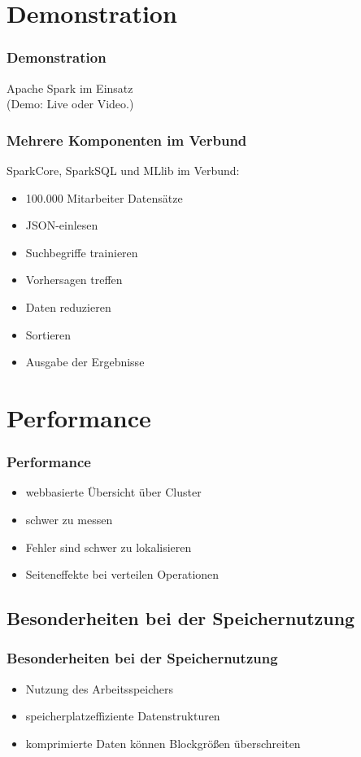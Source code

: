 \documentclass[hyperref={pdfpagelabels=false}]{beamer}
\begin{document}
\section{Demonstration}
\begin{frame} [t]
\frametitle{Demonstration}

Apache Spark im Einsatz \\
\textcolor[rgb]{0.75,0.75,0.75}{(Demo: Live oder Video.)}

\end{frame}


\begin{frame} [t]
\frametitle{Mehrere Komponenten im Verbund}

SparkCore, SparkSQL und MLlib im Verbund: 
\begin{itemize}	
	\item 100.000 Mitarbeiter Datensätze
	\item JSON-einlesen	
	\item Suchbegriffe trainieren
	\item Vorhersagen treffen
	\item Daten reduzieren	
	\item Sortieren
	\item Ausgabe der Ergebnisse	
\end{itemize}

\end{frame}


\section{Performance}
\begin{frame} [t]
\frametitle{Performance}

\begin{itemize}
	\item webbasierte Übersicht über Cluster
	\item schwer zu messen
	\item Fehler sind schwer zu lokalisieren
	\item Seiteneffekte bei verteilen Operationen	
\end{itemize}

\end{frame}

 \subsection{Besonderheiten bei der Speichernutzung}
\begin{frame} [t]
\frametitle{Besonderheiten bei der Speichernutzung}

\begin{itemize}
	\item Nutzung des Arbeitsspeichers
	\item speicherplatzeffiziente Datenstrukturen
	\item komprimierte Daten können Blockgrößen überschreiten	
\end{itemize}

\end{frame}
\end{document}
